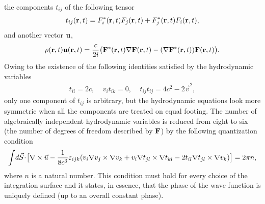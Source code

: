 \documentclass[11pt]{article}
\begin{document}
the components $t_{ij}$ of the following tensor
\begin{eqnarray}
 t_{ij}({\bf r},t) = F^*_i({\bf r},t)F_j({\bf r},t)
 + F^*_j({\bf r},t)F_i({\bf r},t),
\end{eqnarray}
and another vector ${\bf u}$,
\begin{eqnarray}
 \rho({\bf r},t){\bf u}({\bf r},t)
 = \frac{c}{2i}\bigl({\bf F}^*({\bf r},t)\nabla{\bf F}({\bf r},t)
 -(\nabla{\bf F}^*({\bf r},t)){\bf F}({\bf r},t)\bigr).
\end{eqnarray}
Owing to the existence of the following identities satisfied by the
hydrodynamic variables
\begin{eqnarray}
  t_{ii} = 2c,\;\;\;\;
  v_i t_{ik} = 0,\;\;\;\;
  t_{ij} t_{ij} = 4c^2 - 2\vec v^2,
\end{eqnarray}
only one component of $t_{ij}$ is arbitrary, but the hydrodynamic
equations look more symmetric when all the components are treated on equal
footing. The number of algebraically independent hydrodynamic variables is
reduced from eight to six (the number of degrees of freedom described by
${\bf F}$) by the following quantization condition
\begin{equation}
\int\!d\vec S\!\cdot\!\bigl[\nabla\times\vec u
 - \frac{1}{8c^3}\varepsilon_{ijk}
  (v_i{\bf\nabla}v_j\times{\bf\nabla}v_k +
  v_i{\bf\nabla}t_{jl}\times{\bf\nabla}t_{kl} -
  2t_{il}{\bf\nabla}t_{jl}\times{\bf\nabla}v_k)\bigr] = 2\pi n,
\end{equation}
where $n$ is a natural number. This condition must hold for every choice of
the integration surface and it states, in essence, that the phase of the
wave function is uniquely defined (up to an overall constant phase).
\end{document}
